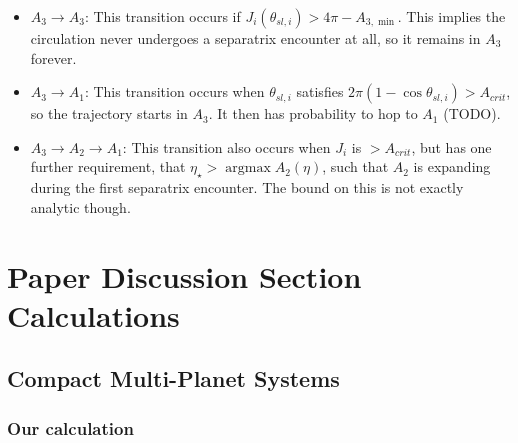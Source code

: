 \documentclass[11pt,
        usenames, %
        dvipsnames %
    ]{article}
\newcommand*{\p}[1]{\left(#1\right)}
\DeclareMathOperator*{\argmax}{argmax}
\begin{document}
\begin{itemize}
    \item $A_3 \to A_3$: This transition occurs if $J_i(\theta_{sl, i}) > 4\pi -
        A_{3, \min}$. This implies the circulation never undergoes a separatrix
        encounter at all, so it remains in $A_3$ forever.

    \item $A_3 \to A_1$: This transition occurs when $\theta_{sl, i}$ satisfies
        $2\pi\p{1 - \cos \theta_{sl, i}} > A_{crit}$, so the trajectory starts
        in $A_3$. It then has probability to hop to $A_1$ (TODO).

    \item $A_3 \to A_2 \to A_1$: This transition also occurs when $J_i$ is
        $> A_{crit}$, but has one further requirement, that $\eta_{\star} >
        \argmax A_2(\eta)$, such that $A_2$ is expanding during the first
        separatrix encounter. The bound on this is not exactly analytic though.
\end{itemize}

\section{Paper Discussion Section Calculations}

\subsection{Compact Multi-Planet Systems}

\subsubsection{Our calculation}
\end{document}
